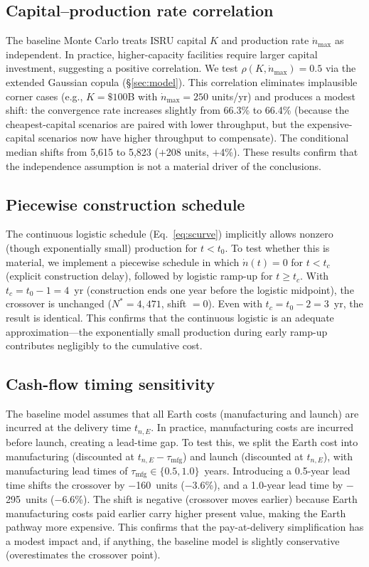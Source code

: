 \documentclass[preprint,12pt]{elsarticle}
\begin{document}
\subsection{Capital--production rate correlation}
\label{sec:k_prod_correlation}

The baseline Monte Carlo treats ISRU capital $K$ and production rate $\dot{n}_{\max}$ as independent. In practice, higher-capacity facilities require larger capital investment, suggesting a positive correlation. We test $\rho(K, \dot{n}_{\max}) = 0.5$ via the extended Gaussian copula (\S\ref{sec:model}). This correlation eliminates implausible corner cases (e.g., $K = \$100$B with $\dot{n}_{\max} = 250$ units/yr) and produces a modest shift: the convergence rate increases slightly from 66.3\% to 66.4\% (because the cheapest-capital scenarios are paired with lower throughput, but the expensive-capital scenarios now have higher throughput to compensate). The conditional median shifts from 5{,}615 to 5{,}823 ($+$208 units, $+$4\%). These results confirm that the independence assumption is not a material driver of the conclusions.

\subsection{Piecewise construction schedule}
\label{sec:piecewise_schedule}

The continuous logistic schedule (Eq.~\ref{eq:scurve}) implicitly allows nonzero (though exponentially small) production for $t < t_0$. To test whether this is material, we implement a piecewise schedule in which $\dot{n}(t) = 0$ for $t < t_c$ (explicit construction delay), followed by logistic ramp-up for $t \geq t_c$. With $t_c = t_0 - 1 = 4$~yr (construction ends one year before the logistic midpoint), the crossover is unchanged ($N^* = 4{,}471$, shift $= 0$). Even with $t_c = t_0 - 2 = 3$~yr, the result is identical. This confirms that the continuous logistic is an adequate approximation---the exponentially small production during early ramp-up contributes negligibly to the cumulative cost.

\subsection{Cash-flow timing sensitivity}
\label{sec:cashflow_timing}

The baseline model assumes that all Earth costs (manufacturing and launch) are incurred at the delivery time $t_{n,E}$. In practice, manufacturing costs are incurred before launch, creating a lead-time gap. To test this, we split the Earth cost into manufacturing (discounted at $t_{n,E} - \tau_{\mathrm{mfg}}$) and launch (discounted at $t_{n,E}$), with manufacturing lead times of $\tau_{\mathrm{mfg}} \in \{0.5, 1.0\}$~years. Introducing a 0.5-year lead time shifts the crossover by $-$160~units ($-$3.6\%), and a 1.0-year lead time by $-$295~units ($-$6.6\%). The shift is negative (crossover moves earlier) because Earth manufacturing costs paid earlier carry higher present value, making the Earth pathway more expensive. This confirms that the pay-at-delivery simplification has a modest impact and, if anything, the baseline model is slightly conservative (overestimates the crossover point).
\end{document}
